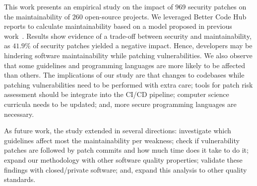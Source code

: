 \documentclass[smallextended]{svjour3}       %
\begin{document}
This work presents an empirical study on the impact of $969$ security
patches on the maintainability of $260$ open-source projects. We leveraged
Better Code Hub reports to calculate maintainability based on a model proposed in 
previous work~\cite{Olivari:2018,8919169}. Results show evidence of a 
trade-off between security and maintainability, as $41.9\%$ of security patches 
yielded a negative impact. Hence,
developers may be hindering software maintainability while patching 
vulnerabilities. We also observe that some guidelines 
and programming languages are more likely to be affected than others. The implications 
of our study are that changes to codebases while patching 
vulnerabilities need to be performed with extra care; tools
for patch risk assessment should be integrate into the CI/CD pipeline; computer science
curricula needs to be updated; and, more secure programming languages are necessary.

As future work, the study extended in several directions: 
investigate which guidelines affect most the maintainability per
weakness; check if vulnerability patches are followed by patch
commits and how much time does it take to do it; 
expand our methodology with other software quality properties; 
validate these findings with closed/private
software; and, expand this analysis to other quality standards.
\end{document}
